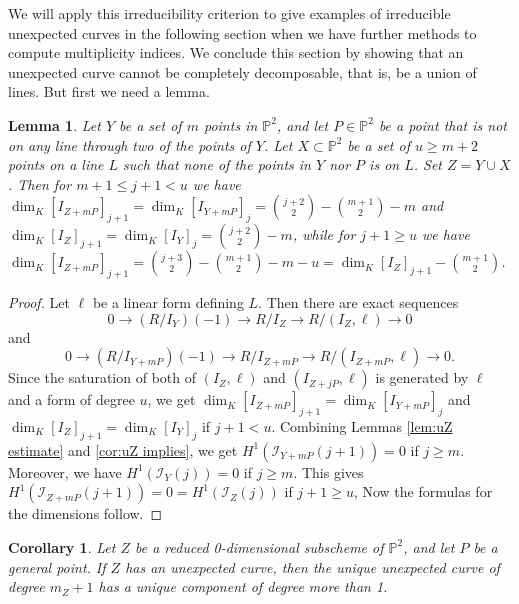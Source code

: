 \documentclass[12pt]{amsart}
\numberwithin{equation}{section}
\newtheorem{lemma}[theorem]{Lemma}
\newtheorem{corollary}[theorem]{Corollary}
\theoremstyle{definition}
\begin{document}
We will apply this irreducibility criterion to give examples of irreducible unexpected  curves in the following section  when we have further methods to compute multiplicity indices. 
We conclude this section by showing that an unexpected curve cannot be completely decomposable, that is, be a union of lines. But first we need a lemma. 

\begin{lemma}
   \label{LinesLemma}
Let $Y$ be a set of $m$ points in ${ \ensuremath{\mathbb{P}}}^2$, and let $P \in { \ensuremath{\mathbb{P}}}^2$ be a point that is not on any line through two of the points of $Y$.    Let $X \subset { \ensuremath{\mathbb{P}}}^2$ be a set of $u \ge m+2$ points on a line $L$ such that  none of the points in $Y$ nor $P$ is on $L$. Set $Z = Y \cup X$. Then for $ m+1 \leq  j+1<u$ we have $\dim_K [I_{Z+mP}]_{j+1}=\dim_K [I_{Y+mP}]_j=\binom{j+2}{2}-\binom{m+1}{2}-m$ and
$\dim_K [I_Z]_{j+1}=\dim_K [I_Y]_j=\binom{j+2}{2}-m$,
while for $j+1\geq u$ we have $\dim_K [I_{Z+mP}]_{j+1}=\binom{j+3}{2}-\binom{m+1}{2}-m-u=\dim_K [I_Z]_{j+1}-\binom{m+1}{2}$.
\end{lemma} 

\begin{proof}
Let $\ell$ be a linear form defining $L$. Then there are exact sequences
\[
0 \to (R/I_Y) (-1) \to R/I_Z \to R/(I_Z, \ell) \to 0
\]
and 
\[
0 \to (R/I_{Y + mP}) (-1) \to R/I_{Z+m P} \to R/(I_{Z+m P}, \ell) \to 0. 
\]
Since the saturation of both of  $(I_Z, \ell)$ and $(I_{Z+j P}, \ell)$ is generated by $\ell$ and a form of degree $u$, we get $\dim_K [I_{Z+mP}]_{j+1}=\dim_K [I_{Y+mP}]_j$ and $\dim_K [I_Z]_{j+1}=\dim_K [I_Y]_j$ if $j+1 < u$. Combining Lemmas \ref{lem:uZ estimate} and \ref{cor:uZ implies}, we get $H^1(\mathcal I_{Y+mP}(j+1))=0$ if $j \ge m$. Moreover, we have $H^1(\mathcal I_Y(j)) = 0$ if $j \ge m$. This gives  $H^1(\mathcal I_{Z+mP}(j+1))=0 =  H^1(\mathcal I_Z(j))$ if $j+1\ge u$, 
Now the formulas for the dimensions follow. 
\end{proof}

\begin{corollary}\label{CurveComponentsCor}
Let $Z$ be a reduced 0-dimensional subscheme of ${ \ensuremath{\mathbb{P}}}^2$, and let $P$ be a general point.
If $Z$ has an unexpected curve, then the unique unexpected curve of degree $m_Z+1$ has a  unique component of degree more than 1. 
\end{corollary}
\end{document}
